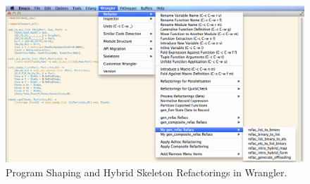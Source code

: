 \documentclass[final]{jfp1}
\begin{document}
\begin{figure}[t]
\begin{center}
\includegraphics[width=0.9\linewidth]{figures/wrangler_nbody.png}
\caption{Program Shaping and Hybrid Skeleton Refactorings in Wrangler.}
\label{wranglerscreenshot}
\end{center}
\end{figure}


%
\end{document}
